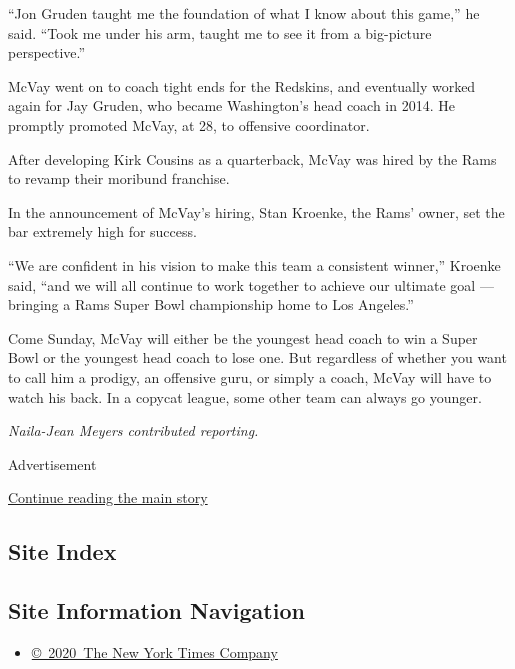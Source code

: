 ``Jon Gruden taught me the foundation of what I know about this game,''
he said. ``Took me under his arm, taught me to see it from a big-picture
perspective.''

McVay went on to coach tight ends for the Redskins, and eventually
worked again for Jay Gruden, who became Washington's head coach in 2014.
He promptly promoted McVay, at 28, to offensive coordinator.

After developing Kirk Cousins as a quarterback, McVay was hired by the
Rams to revamp their moribund franchise.

In the announcement of McVay's hiring, Stan Kroenke, the Rams' owner,
set the bar extremely high for success.

``We are confident in his vision to make this team a consistent
winner,'' Kroenke said, ``and we will all continue to work together to
achieve our ultimate goal --- bringing a Rams Super Bowl championship
home to Los Angeles.''

Come Sunday, McVay will either be the youngest head coach to win a Super
Bowl or the youngest head coach to lose one. But regardless of whether
you want to call him a prodigy, an offensive guru, or simply a coach,
McVay will have to watch his back. In a copycat league, some other team
can always go younger.

\emph{Naila-Jean Meyers contributed reporting.}

Advertisement

\protect\hyperlink{after-bottom}{Continue reading the main story}

\hypertarget{site-index}{%
\subsection{Site Index}\label{site-index}}

\hypertarget{site-information-navigation}{%
\subsection{Site Information
Navigation}\label{site-information-navigation}}

\begin{itemize}
\tightlist
\item
  \href{https://help.nytimes3xbfgragh.onion/hc/en-us/articles/115014792127-Copyright-notice}{©~2020~The
  New York Times Company}
\end{itemize}

